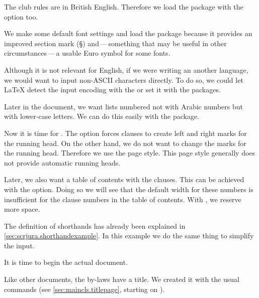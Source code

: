 %
The club rules are in British English. Therefore we load the 
package with the  option too.

%
We make some default font settings and load the  package
because it provides an improved section mark (\S) and\,---\,something that may
be useful in other circumstances\,---\,a usable Euro symbol for some fonts.

Although it is not relevant for English, if we were writing an another
language, we would want to input non-ASCII characters directly. To do so, we
could let \LaTeX{} detect the input encoding with the  or
set it with the  packages.

%
Later in the document, we want lists numbered not with Arabic numbers but with
lower-case letters. We can do this easily with the  package.

%
Now it is time for . The
 option forces clauses to
create left and right marks for the running head. On the other hand, we do not
want  to change the marks for the running head.
Therefore we use the  page style. This page style
generally does not provide automatic running heads.

Later, we also want a table of contents with the clauses. This can be achieved
with the  option. Doing so we will see
that the default width for these numbers is insufficient for the clause
numbers in the table of contents. With
, we reserve more space.

The definition of shorthands has already been explained in
\autoref{sec:scrjura.shorthandexample}. In this example we do the same thing
to simplify the input.

%
It is time to begin the actual document.

%
Like other documents, the by-laws have a title. We created it with the usual
\KOMAScript{} commands (see \autoref{sec:maincls.titlepage}, starting on
).

